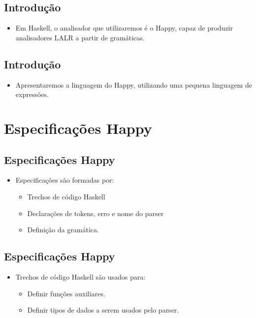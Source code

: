 \documentclass[11pt]{article}
\begin{document}
\subsection*{Introdução}
\label{sec:org1ab801e}

\begin{itemize}
\item Em Haskell, o analisador que utilizaremos é o Happy, capaz de produzir analisadores LALR a partir de gramáticas.
\end{itemize}
\subsection*{Introdução}
\label{sec:orged6b48a}

\begin{itemize}
\item Apresentaremos a linguagem do Happy, utilizando uma pequena linguagem de expressões.
\end{itemize}
\section*{Especificações Happy}
\label{sec:orgb5852b4}

\subsection*{Especificações Happy}
\label{sec:orgc766b4e}

\begin{itemize}
\item Especificações são formadas por:
\begin{itemize}
\item Trechos de código Haskell
\item Declarações de tokens, erro e nome do parser
\item Definição da gramática.
\end{itemize}
\end{itemize}
\subsection*{Especificações Happy}
\label{sec:orgfe4682c}

\begin{itemize}
\item Trechos de código Haskell são usados para:
\begin{itemize}
\item Definir funções auxiliares.
\item Definir tipos de dados a serem usados pelo parser.
\end{itemize}
\end{itemize}
\end{document}
